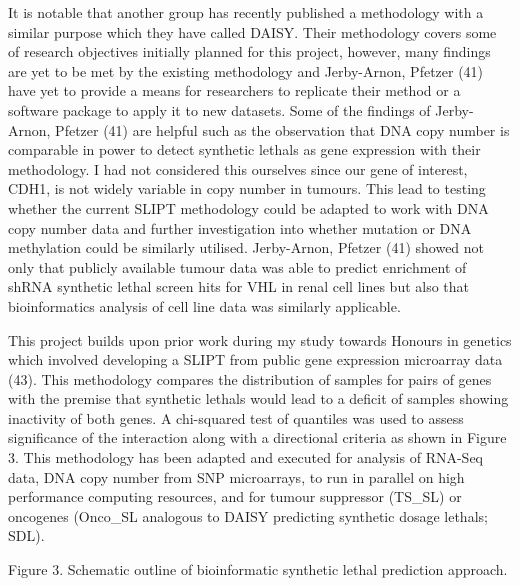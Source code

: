 It is notable that another group has recently published a methodology with a similar purpose which they have called \acrfull{DAISY}. Their methodology covers some of research objectives initially planned for this project, however, many findings are yet to be met by the existing methodology and Jerby-Arnon, Pfetzer (41) have yet to provide a means for researchers to replicate their method or a software package to apply it to new datasets. Some of the findings of Jerby-Arnon, Pfetzer (41) are helpful such as the observation that \acrshort{DNA} copy number is comparable in power to detect \glspl{synthetic lethal} as \gls{gene expression} with their methodology. I had not considered this ourselves since our gene of interest, CDH1, is not widely variable in copy number in \glspl{tumour}. This lead to testing whether the current \gls{SLIPT} methodology could be adapted to work with \acrshort{DNA} copy number data and further investigation into whether  \gls{mutation} or \acrshort{DNA} methylation could be similarly utilised. Jerby-Arnon, Pfetzer (41) showed not only that publicly available tumour data was able to predict enrichment of \gls{shRNA} \gls{synthetic lethal} screen hits for VHL in renal cell lines but also that \gls{bioinformatics} analysis of cell line data was similarly applicable.

This project builds upon prior work during my study towards Honours in genetics which involved developing a \gls{SLIPT} from public \gls{gene expression} \gls{microarray} data (43). This methodology compares the distribution of samples for pairs of genes with the premise that \glspl{synthetic lethal} would lead to a deficit of samples showing inactivity of both genes. A chi-squared test of quantiles was used to assess significance of the interaction along with a directional criteria as shown in Figure 3. This methodology has been adapted and executed for analysis of \gls{RNA-Seq}  data, \acrshort{DNA} copy number from SNP \glspl{microarray}, to run in parallel on high performance computing resources, and for \gls{tumour suppressor} (TS\_SL) or \glspl{oncogene} (Onco\_SL analogous to \gls{DAISY} predicting \glspl{synthetic dosage lethal}; SDL).

Figure 3. Schematic outline of bioinformatic \gls{synthetic lethal} prediction approach.


